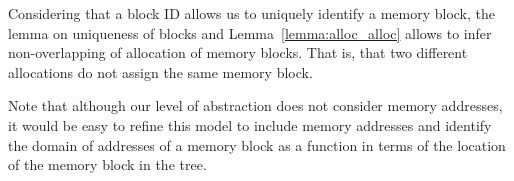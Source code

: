 

Considering that a block ID allows us to uniquely identify a memory block, the lemma on uniqueness of blocks and Lemma~\ref{lemma:alloc_alloc} allows to infer non-overlapping of allocation of memory blocks. That is, that two different allocations do not assign the same memory block.

Note that although our level of abstraction does not consider memory addresses, it would be easy to refine this model to include memory addresses and identify the domain of addresses of a memory block as a function in terms of the location of the memory block in the tree.

